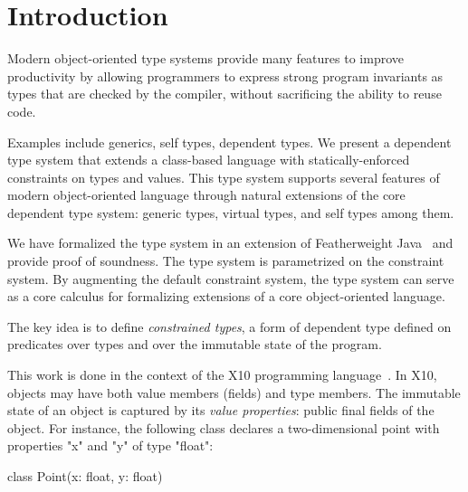 \documentclass[preprint,nocopyrightspace,9pt]{sigplanconf}
\begin{document}
\section{Introduction}
\label{sec:intro}






Modern object-oriented type systems provide 
many features to improve productivity by 
allowing programmers to express strong program
invariants as types that are
checked by the compiler, without sacrificing the ability to
reuse code.

Examples include generics, self types, 
dependent types. 
We present a dependent type system
that extends a class-based language with
statically-enforced constraints on
types and values.
This type system 
supports several features of modern object-oriented 
language through natural extensions of the core dependent type
system: generic types, virtual types, and self types
among them.

We have formalized the type system in an extension of
Featherweight Java~\cite{FJ}
and provide proof of soundness.
The type system is parametrized on the constraint system.
By augmenting the default constraint system,
the type system can serve as a core calculus 
for formalizing extensions of a core object-oriented language. 

The key idea is to define
\emph{constrained types},
a form of dependent type
defined on predicates over types and over the immutable state of
the program.

This work is done in the context of the X10
programming language~\cite{X10}.
In X10, objects may have both value members (fields)
and type members.
The immutable state of an object is captured by its
\emph{value properties}: public final fields of the object.
For instance, the following class declares a two-dimensional
point with properties \xcd"x" and \xcd"y" of type \xcd"float":
\begin{xten}
class Point(x: float, y: float) { }
\end{xten}
\end{document}
